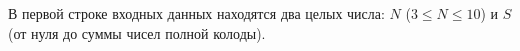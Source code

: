В первой строке входных данных находятся два целых числа: $N$ ($3 \le N \le 10$)
и $S$ (от нуля до суммы чисел полной колоды).
